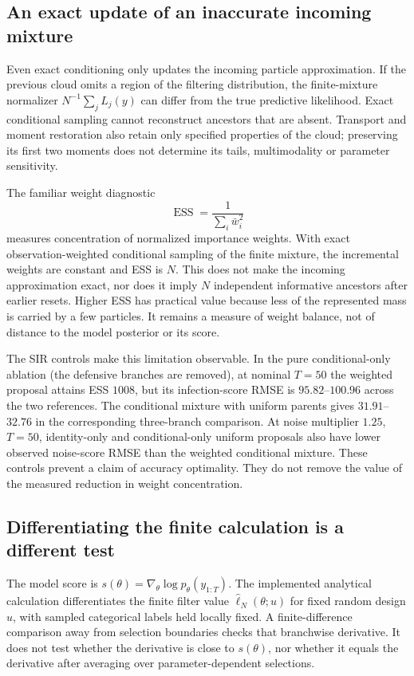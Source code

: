 \subsection{An exact update of an inaccurate incoming mixture}

Even exact conditioning only updates the incoming particle approximation.
If the previous cloud omits a region of the filtering distribution, the
finite-mixture normalizer $N^{-1}\sum_j L_j(y)$ can differ from the true
predictive likelihood. Exact conditional sampling cannot reconstruct
ancestors that are absent. Transport and moment restoration also retain only
specified properties of the cloud; preserving its first two moments does
not determine its tails, multimodality or parameter sensitivity.

The familiar weight diagnostic
\begin{equation}
 \operatorname{ESS}=\frac{1}{\sum_i \bar w_i^2}
\end{equation}
measures concentration of normalized importance weights. With exact
observation-weighted conditional sampling of the finite mixture, the
incremental weights are constant and ESS is $N$. This does not make the
incoming approximation exact, nor does it imply $N$ independent informative
ancestors after earlier resets. Higher ESS has practical value because less
of the represented mass is carried by a few particles. It remains a measure
of weight balance, not of distance to the model posterior or its score.

The SIR controls make this limitation observable. In the pure
conditional-only ablation (the defensive branches are removed), at nominal
$T=50$ the weighted proposal attains ESS $1008$, but its infection-score
RMSE is $95.82$--$100.96$ across the two references. The conditional mixture
with uniform parents gives $31.91$--$32.76$ in the corresponding
three-branch comparison. At noise multiplier $1.25$,
$T=50$, identity-only and conditional-only uniform proposals also have lower
observed noise-score RMSE than the weighted conditional mixture. These
controls prevent a claim of accuracy optimality. They do not remove the
value of the measured reduction in weight concentration.

\subsection{Differentiating the finite calculation is a different test}

The model score is $s(\theta)=\nabla_\theta\log p_\theta(y_{1:T})$.
The implemented analytical calculation differentiates the finite filter
value $\widehat\ell_N(\theta;u)$ for fixed random design $u$, with sampled
categorical labels held locally fixed. A finite-difference comparison away
from selection boundaries checks that branchwise derivative. It does not
test whether the derivative is close to $s(\theta)$, nor whether it equals
the derivative after averaging over parameter-dependent selections.

